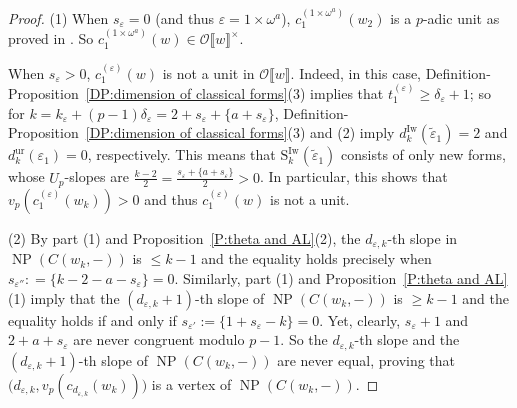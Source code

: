 \documentclass[12pt]{amsart}
\newcommand{\liang}[1]{{\color{blue} \sf $\clubsuit\clubsuit\clubsuit$ Liang: [#1]}}
\newcommand{\bin}[1]{{\color{red} \sf $\heartsuit\heartsuit\heartsuit$ Bin: [#1]}}
\theoremstyle{definition}
\numberwithin{equation}{subsection}
\def\calO{\mathcal{O}}
\def\rmS{\mathrm{S}}
\DeclareMathOperator{\NP}{NP}
\newcommand{\Iw}{\mathrm{Iw}}
\newcommand{\ur}{\mathrm{ur}}
\begin{document}
\begin{proof}
(1) When $s_\varepsilon=0$ (and thus $\varepsilon =1 \times \omega^a$), $c_1^{(1 \times \omega^a)}(w_2)$ is a $p$-adic unit as proved in \cite[Proposition A.7]{liu-truong-xiao-zhao}. So $c_1^{(1 \times \omega^a)}(w) \in \calO\llbracket w\rrbracket^\times$.

When $s_\varepsilon > 0$, $c_1^{(\varepsilon)}(w)$ is not a unit in $\calO\llbracket w\rrbracket$.
Indeed, in this case, Definition-Proposition~\ref{DP:dimension of classical forms}(3) implies that $t_1^{(\varepsilon)} \geq \delta_\varepsilon+1$; so for $k = k_\varepsilon + (p-1)\delta_\varepsilon = 2+ s_\varepsilon+\{a+s_\varepsilon\}$, Definition-Proposition~\ref{DP:dimension of classical forms}(3) and (2) imply $d_{k}^\Iw(\tilde \varepsilon_1) = 2$ and $d_{k}^\ur(\varepsilon_1) =0$, respectively. This means that $\rmS_k^\Iw(\tilde \varepsilon_1)$ consists of only new forms, whose $U_p$-slopes are $\frac{k-2}2 = \frac{s_\varepsilon+\{a+s_\varepsilon\}}2>0$. In particular, this shows that $v_p(c_1^{(\varepsilon)}(w_k)) >0$ and thus $c_1^{(\varepsilon)}(w)$ is not a unit.




(2) By part (1) and Proposition~\ref{P:theta and AL}(2), the $d_{\varepsilon,k}$-th slope in $\NP(C(w_k,-))$ is $\leq k-1$
and the equality holds precisely when $s_{\varepsilon''}: = \{k-2-a-s_\varepsilon\} = 0$.  Similarly, part (1) and Proposition~\ref{P:theta and AL}(1) imply that the $(d_{\varepsilon, k}+1)$-th slope of $\NP(C(w_k,-))$ is $\geq k-1$ and the equality holds if and only if $s_{\varepsilon'} := \{1+s_\varepsilon-k \}=0 $. Yet, clearly, $s_\varepsilon+1$ and $2+a+s_\varepsilon$ are never congruent modulo $p-1$. So the $d_{\varepsilon,k}$-th slope and the $(d_{\varepsilon,k}+1)$-th slope of $\NP(C(w_k, -))$ are never equal, proving that $\big(d_{\varepsilon, k}, v_p(c_{d_{\varepsilon,k}}(w_k))\big)$ is a vertex of $\NP(C(w_k,-))$.


\end{proof}
\end{document}
